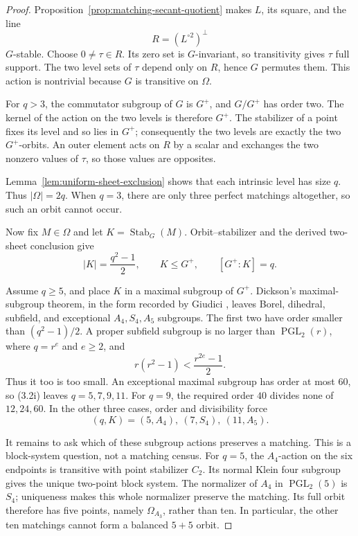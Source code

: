 \documentclass[11pt]{article}
\theoremstyle{definition}
\theoremstyle{remark}
\begin{document}
\begin{proof}
Proposition~\ref{prop:matching-secant-quotient} makes \(L\), its square,
and the line
\[
 R=(L^{\circ2})^\perp
\]
\(G\)-stable.  Choose \(0\ne\tau\in R\).  Its zero set is
\(G\)-invariant, so transitivity gives \(\tau\) full support.  The two
level sets of \(\tau\) depend only on \(R\), hence \(G\) permutes them.
This action is nontrivial because \(G\) is transitive on \(\Omega\).

For \(q>3\), the commutator subgroup of \(G\) is \(G^+\), and \(G/G^+\)
has order two.  The kernel of the action on the two levels is therefore
\(G^+\).  The stabilizer of a point fixes its level and so lies in
\(G^+\); consequently the two levels are exactly the two \(G^+\)-orbits.
An outer element acts on \(R\) by a scalar and exchanges the two nonzero
values of \(\tau\), so those values are opposites.

Lemma~\ref{lem:uniform-sheet-exclusion} shows that each intrinsic level
has size \(q\).  Thus \(|\Omega|=2q\).  When \(q=3\), there are only
three perfect matchings altogether, so such an orbit cannot occur.

Now fix \(M\in\Omega\) and let \(K=\operatorname{Stab}_G(M)\).
Orbit--stabilizer and the derived two-sheet conclusion give
\[
 |K|=\frac{q^2-1}{2},\qquad K\leq G^+,\qquad [G^+:K]=q.    \tag{3.2i}
\]

Assume \(q\geq5\), and place \(K\) in a maximal subgroup of \(G^+\).
Dickson's maximal-subgroup theorem, in the form recorded by Giudici
\cite[Theorem~2.2]{Giudici2007}, leaves Borel, dihedral, subfield, and
exceptional \(A_4,S_4,A_5\) subgroups.  The first two have order smaller
than \((q^2-1)/2\).  A proper subfield subgroup is no larger than
\(\operatorname{PGL}_2(r)\), where \(q=r^e\) and \(e\geq2\), and
\[
 r(r^2-1)<\frac{r^{2e}-1}{2}.
\]
Thus it too is too small.  An exceptional maximal subgroup has order at
most \(60\), so (3.2i) leaves \(q=5,7,9,11\).  For \(q=9\), the required
order \(40\) divides none of \(12,24,60\).  In the other three cases,
order and divisibility force
\[
 (q,K)=(5,A_4),\ (7,S_4),\ (11,A_5).                    \tag{3.2j}
\]

It remains to ask which of these subgroup actions preserves a matching.
This is a block-system question, not a matching census.  For \(q=5\),
the \(A_4\)-action on the six endpoints is transitive with point
stabilizer \(C_2\).  Its normal Klein four subgroup gives the unique
two-point block system.  The normalizer of \(A_4\) in
\(\operatorname{PGL}_2(5)\) is \(S_4\); uniqueness makes this whole
normalizer preserve the matching.  Its full orbit therefore has five
points, namely \(\Omega_{A_3}\), rather than ten.  In particular, the
other ten matchings cannot form a balanced \(5+5\) orbit.


\end{proof}
\end{document}

